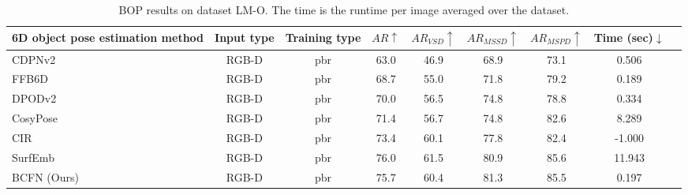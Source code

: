 \begin{table}[htbp]
        \centering
        \caption{
                BOP results on dataset LM-O. The time is the runtime per image averaged over the dataset.
        }
        \begin{tabular}{l c c c c c c c c}
        \toprule
        6D object pose estimation method &Input type&Training type&$AR\uparrow$&$AR_{VSD}\uparrow$&$AR_{MSSD}\uparrow$&$AR_{MSPD}\uparrow$&Time (sec)$\downarrow$\\
        \midrule
        CDPNv2~\cite{li2019cdpn} & RGB-D & pbr & 	63.0	&46.9&	68.9&	73.1&	0.506 \\
        FFB6D~\cite{he2021ffb6d} & RGB-D & pbr & 68.7 & 55.0 & 71.8	& 79.2	& 0.189 \\
        DPODv2~\cite{shugurov2021dpodv2} & RGB-D & pbr & 70.0&	56.5&	74.8&	78.8&	0.334 \\
        CosyPose~\cite{labbe2020cosypose} & RGB-D & pbr & 71.4 &	56.7 &	74.8 &	82.6 &	8.289 \\
        CIR~\cite{lipson2022cir} & RGB-D & pbr & 	73.4	&60.1&	77.8&	82.4	&-1.000 \\
        SurfEmb~\cite{haugaard2022surfemb} & RGB-D & pbr &	76.0&	61.5&	80.9&	85.6&	11.943 \\
        \midrule
        BCFN (Ours) & RGB-D& pbr & 75.7 & 60.4 & 81.3 & 85.5 & 0.197\\
        \bottomrule
        \end{tabular}
\label{tab:lmo_bop}
\end{table}